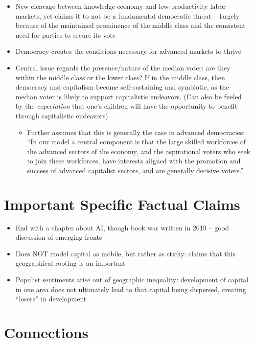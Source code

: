\documentclass[12pt]{article}
\begin{document}
\begin{itemize}[leftmargin=*, itemsep=4pt]
\begin{enumerate}
    \end{enumerate}
    \item New cleavage between knowledge economy and low-productivity labor markets, yet claims it to not be a fundamental democratic threat -- largely because of the maintained prominence of the middle class and the consistent need for parties to secure its vote
    \item Democracy creates the conditions necessary for advanced markets to thrive
    \item Central issue regards the presence/nature of the median voter: are they within the middle class or the lower class? If in the middle class, then democracy and capitalism become self-sustaining and symbiotic, as the median voter is likely to support capitalistic endeavors. (Can also be fueled by the \emph{expectation} that one's children will have the opportunity to benefit through capitalistic endeavors)
    \begin{itemize}
        \item Further assumes that this is generally the case in advanced democracies: ``In our model a central component is that the large skilled workforces of the advanced sectors of the economy, and the aspirational voters who seek to join these workforces, have interests aligned with the promotion and success of advanced capitalist sectors, and are generally decisive voters.''
    \end{itemize}
\end{itemize}


\section{Important Specific Factual Claims}

\begin{itemize}[leftmargin=*, itemsep=4pt]
    \item End with a chapter about AI, though book was written in 2019 -- good discussion of emerging fronts
    \item Does NOT model capital as mobile, but rather as sticky: claims that this geographical rooting is an important 
    \item Populist sentiments arise out of geographic inequality: development of capital in one area does not ultimately lead to that capital being dispersed, creating ``losers'' in development
\end{itemize}


\section{Connections}
\end{document}

